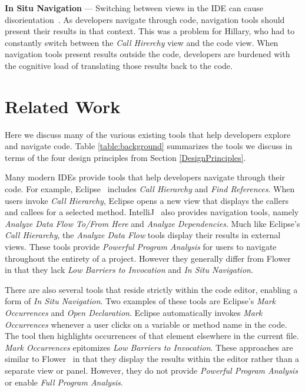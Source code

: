 \documentclass[conference]{IEEEtran}
\newcommand{\toolName}{Flower}
\begin{document}
\vspace{1em} 
\noindent\textbf{In Situ Navigation}  ---
Switching between views in the IDE can cause disorientation~\cite{deAlwis2006disorient}. 
As developers navigate through code, navigation tools should present their results in that context. 
This was a problem for Hillary, who had to constantly switch between the \emph{Call Hirerchy} view and the code view.
When navigation tools present results outside the code, developers are burdened with the cognitive load of translating those results back to the code.

\section{Related Work}
Here we discuss many of the various existing tools that help developers explore and navigate code. Table \ref{table:background} summarizes the tools we discuss in terms of the four design principles from Section \ref{DesignPrinciples}.

Many modern IDEs provide tools that help developers navigate through their code. 
For example, Eclipse~\cite{Eclipse} includes \emph{Call Hierarchy} and \emph{Find References}. 
When users invoke \emph{Call Hierarchy}, Eclipse opens a new view that displays the callers and callees for a selected method.  
IntelliJ~\cite{IntelliJ} also provides navigation tools, namely \emph{Analyze Data Flow To/From Here} and \emph{Analyze Dependencies}.
Much like Eclipse's \emph{Call Hierarchy}, the \emph{Analyze Data Flow} tools display their results in external views. 
These tools provide \textit{Powerful Program Analysis} for users to navigate throughout the entirety of a project. 
However they generally differ from \toolName~ in that they lack \textit{Low Barriers to Invocation} and \textit{In Situ Navigation}.

There are also several tools that reside strictly within the code editor, enabling a form of \textit{In Situ Navigation}.
Two examples of these tools are Eclipse's \emph{Mark Occurrences} and \emph{Open Declaration}. 
Eclipse automatically invokes \emph{Mark Occurrences} whenever a user clicks on a variable or method name in the code.
The tool then highlights occurrences of that element elsewhere in the current file.
\emph{Mark Occurrences} epitomizes \textit{Low Barriers to Invocation}.
These approaches are similar to \toolName~ in that they display the results within the editor rather than a separate view or panel.
However, they do not provide \textit{Powerful Program Analysis} or enable \textit{Full Program Analysis}.
\end{document}
